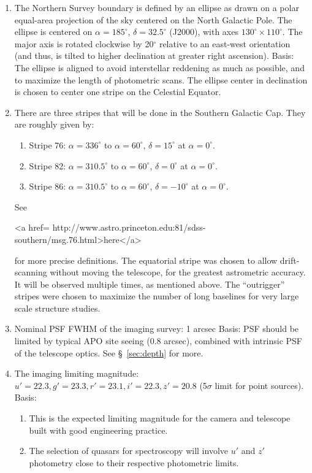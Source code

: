 \begin{enumerate}
\item The Northern Survey boundary is defined by an ellipse as drawn
on a polar equal-area projection of the sky centered on the North Galactic Pole.
The ellipse is centered on $\alpha = 185^\circ$,
$\delta = 32.5^\circ$ (J2000), with axes $130^\circ \times
110^\circ$.  The major
axis is rotated clockwise by 20$^\circ$ relative to an east-west orientation
(and thus, is tilted to higher declination at greater right ascension).
\hfil\break
Basis: The ellipse is aligned to avoid interstellar reddening as much as
possible, and to maximize the length of photometric scans.  The ellipse
center in declination is chosen to center one stripe on the Celestial Equator.

\item There are three stripes that will be done in the Southern
Galactic Cap.  They are roughly given by: 
\begin{enumerate}
\item Stripe 76: $\alpha = 336^\circ$ to $\alpha = 60^\circ$, $\delta =
15^\circ$ at $\alpha = 0^\circ$.
\item Stripe 82: $\alpha = 310.5^\circ$ to $\alpha = 60^\circ$, $\delta =
0^\circ$ at $\alpha = 0^\circ$.
\item Stripe 86: $\alpha = 310.5^\circ$ to $\alpha = 60^\circ$, $\delta =
-10^\circ$ at $\alpha = 0^\circ$.
\end{enumerate}
See 
\begin{rawhtml}
<a href= http://www.astro.princeton.edu:81/sdss-southern/msg.76.html>here</a>\end{rawhtml}
for more precise definitions.  The equatorial stripe was chosen to
allow drift-scanning without moving the telescope, for the greatest
astrometric accuracy.  It will be observed multiple times, as
mentioned above.  The ``outrigger'' stripes were chosen to
maximize the number of long baselines for very large scale structure
studies. 

\item  Nominal PSF FWHM of the imaging survey: 1 arcsec\hfil\break
Basis: PSF should be limited by typical APO site seeing (0.8 arcsec),
combined with intrinsic PSF of the telescope optics.  See
\S~\ref{sec:depth} for more. 

\item The imaging limiting magnitude: $u'=22.3, g'= 23.3, r'=23.1, i'=22.3, z'=20.8$
(5$\sigma$ limit for point sources).\hfil\break
Basis:
\begin{enumerate}
\item This is the expected limiting magnitude for the camera and
telescope built with good engineering practice.
\item The selection of quasars for spectroscopy will involve $u'$ and
$z'$ 
photometry close to their respective photometric limits. 
\end{enumerate}


\end{enumerate}
